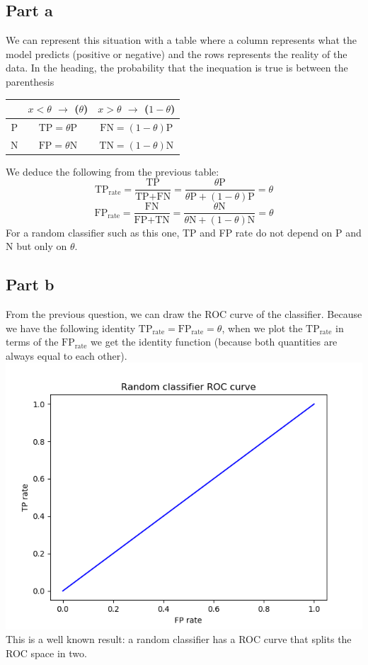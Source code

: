\documentclass[a4paper, 10pt]{article}
\begin{document}
\subsection{Part a}
We can represent this situation with a table where a column represents what the model predicts (positive or negative)
and the rows represents the reality of the data. In the heading, the probability that the inequation is true is between the parenthesis
\\
\begin{center}
\begin{tabular}{ |c|c|c| }
    \hline
    \  & $x<\theta$ $\rightarrow$ ($\theta$) & $x>\theta$ $\rightarrow$ ($1-\theta$) \\
    \hline
    P & $\text{TP} = \theta \text{P}$ & $\text{FN} = (1-\theta) \text{P}$ \\
    N & $\text{FP} = \theta \text{N}$ & $\text{TN} = (1-\theta) \text{N}$ \\
    \hline
\end{tabular}
\end{center}
We deduce the following from the previous table:
$$
\text{TP}_{\text{rate}} = \frac{\text{TP}}{\text{TP}+\text{FN}} = \frac{\theta \text{P}}{\theta \text{P} +(1-\theta)\text{P}} = \theta
$$
$$
\text{FP}_{\text{rate}} = \frac{\text{FN}}{\text{FP}+\text{TN}} = \frac{\theta \text{N}}{\theta \text{N} + (1-\theta)\text{N}} = \theta
$$
For a random classifier such as this one, TP and FP rate do not depend
on P and N but only on $\theta$.

\subsection{Part b}
From the previous question, we can draw the ROC curve of the classifier.
Because we have the following identity $\text{TP}_\text{rate} = \text{FP}_\text{rate} = \theta$,
when we plot the $\text{TP}_\text{rate}$ in terms of the $\text{FP}_\text{rate}$ we get
the identity function (because both quantities are always equal to each other).
\\
\includegraphics{ex2b}
\\
This is a well known result: a random classifier has a ROC curve that
splits the ROC space in two.
\end{document}
